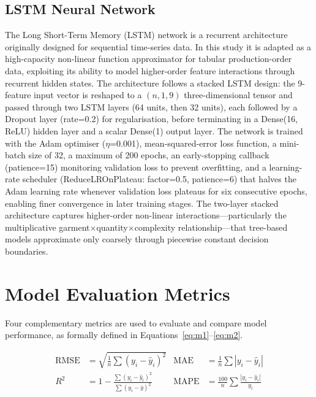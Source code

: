 \subsection{LSTM Neural Network}
The Long Short-Term Memory (LSTM) network is a recurrent architecture originally designed for sequential time-series data. In this study it is adapted as a high-capacity non-linear function approximator for tabular production-order data, exploiting its ability to model higher-order feature interactions through recurrent hidden states. The architecture follows a stacked LSTM design: the 9-feature input vector is reshaped to a $(n, 1, 9)$ three-dimensional tensor and passed through two LSTM layers (64 units, then 32 units), each followed by a Dropout layer (rate=0.2) for regularisation, before terminating in a Dense(16, ReLU) hidden layer and a scalar Dense(1) output layer. The network is trained with the Adam optimiser ($\eta$=0.001), mean-squared-error loss function, a mini-batch size of 32, a maximum of 200 epochs, an early-stopping callback (patience=15) monitoring validation loss to prevent overfitting, and a learning-rate scheduler (ReduceLROnPlateau: factor=0.5, patience=6) that halves the Adam learning rate whenever validation loss plateaus for six consecutive epochs, enabling finer convergence in later training stages. The two-layer stacked architecture captures higher-order non-linear interactions---particularly the multiplicative garment$\times$quantity$\times$complexity relationship---that tree-based models approximate only coarsely through piecewise constant decision boundaries.

\secdiv
\section{Model Evaluation Metrics}
\label{sec:metrics}
Four complementary metrics are used to evaluate and compare model performance, as formally defined in Equations~\ref{eq:m1}--\ref{eq:m2}.

\begin{mdframed}[style=eqbox]
\begin{align}
\text{RMSE}&=\sqrt{\tfrac{1}{n}\sum(y_i-\hat{y}_i)^2}&\text{MAE}&=\tfrac{1}{n}\sum|y_i-\hat{y}_i|\label{eq:m1}\\
R^2&=1-\tfrac{\sum(y_i-\hat{y}_i)^2}{\sum(y_i-\bar{y})^2}&\text{MAPE}&=\tfrac{100}{n}\sum\tfrac{|y_i-\hat{y}_i|}{y_i}\label{eq:m2}
\end{align}
\end{mdframed}

